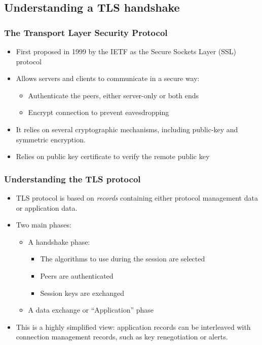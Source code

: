 \subsection{Understanding a TLS handshake}

\begin{frame}
  \frametitle{The Transport Layer Security Protocol}
  \begin{itemize}
    \item First proposed in 1999 by the IETF as the Secure Sockets Layer (SSL)
      protocol
    \item Allows servers and clients to communicate in a secure way:
      \begin{itemize}
        \item Authenticate the peers, either server-only or both ends
        \item Encrypt connection to prevent eavesdropping
      \end{itemize}
    \item It relies on several cryptographic mechanisms, including public-key
      and symmetric encryption.
    \item Relies on public key certificate to verify the remote public key
  \end{itemize}
\end{frame}

\begin{frame}
  \frametitle{Understanding the TLS protocol}
  \begin{itemize}
    \item TLS protocol is based on \emph{records} containing either protocol
      management data or application data.
    \item Two main phases:
      \begin{itemize}
        \item A handshake phase:
          \begin{itemize}
            \item The algorithms to use during the session are selected
            \item Peers are authenticated
            \item Session keys are exchanged
          \end{itemize}
        \item A data exchange or ``Application'' phase
      \end{itemize}
    \item This is a highly simplified view: application records can be
      interleaved with connection management records, such as key renegotiation or
      alerts.
  \end{itemize}
\end{frame}

